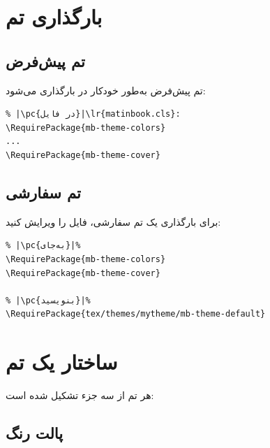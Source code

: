 
\section{بارگذاری تم}
\label{sec:themes-loading}

\subsection{تم پیش‌فرض}
\label{sec:themes-loading-default}

تم پیش‌فرض به‌طور خودکار در 
بارگذاری می‌شود:

\begin{latin}
\begin{verbatim}
% |\pc{در فایل}|\lr{matinbook.cls}:
\RequirePackage{mb-theme-colors}
...
\RequirePackage{mb-theme-cover}
\end{verbatim}
\end{latin}


\subsection{تم سفارشی}
\label{sec:themes-loading-custom}

برای بارگذاری یک تم سفارشی، فایل
 را ویرایش کنید:

\begin{latin}
\begin{verbatim}
% |\pc{به‌جای}|%
\RequirePackage{mb-theme-colors}
\RequirePackage{mb-theme-cover}

% |\pc{بنویسید}|%
\RequirePackage{tex/themes/mytheme/mb-theme-default}
\end{verbatim}
\end{latin}


\section{ساختار یک تم}
\label{sec:themes-components}

هر تم از سه جزء تشکیل شده است:

\subsection{پالت رنگ}
\label{sec:themes-colors}

